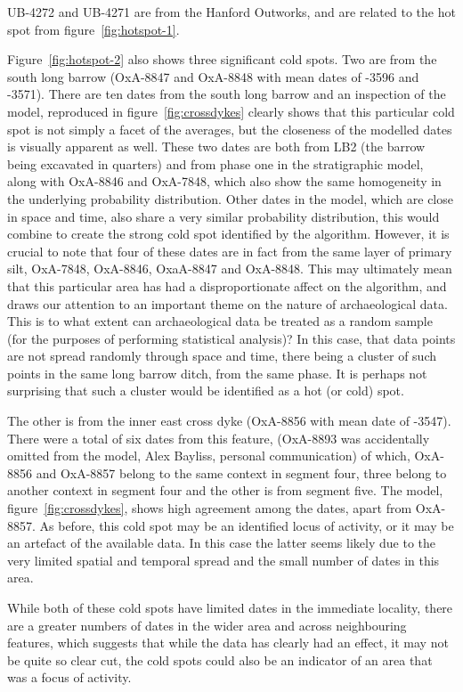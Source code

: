 UB-4272 and UB-4271 are from the Hanford Outworks, and are related to the hot spot from figure~\ref{fig:hotspot-1}.

Figure~\ref{fig:hotspot-2} also shows three significant cold spots. Two are from the south long barrow (OxA-8847 and OxA-8848 with mean dates of -3596 and -3571). There are ten dates from the south long barrow and an inspection of the model, reproduced in figure~\ref{fig:crossdykes} clearly shows that this particular cold spot is not simply a facet of the averages, but the closeness of the modelled dates is visually apparent as well. These two dates are both from LB2 (the barrow being excavated in quarters) and from phase one in the stratigraphic model, along with OxA-8846 and OxA-7848, which also show the same homogeneity in the underlying probability distribution. Other dates in the model, which are close in space and time, also share a very similar probability distribution, this would combine to create the strong cold spot identified by the algorithm. However, it is crucial to note that four of these dates are in fact from the same layer of primary silt, OxA-7848, OxA-8846, OxaA-8847 and OxA-8848. This may ultimately mean that this particular area has had a disproportionate affect on the algorithm, and draws our attention to an important theme on the nature of archaeological data. This is to what extent can archaeological data be treated as a random sample (for the purposes of performing statistical analysis)? In this case, that data points are not spread randomly through space and time, there being a cluster of such points in the same long barrow ditch, from the same phase. It is perhaps not surprising that such a cluster would be identified as a hot (or cold) spot.

The other is from the inner east cross dyke (OxA-8856 with mean date of -3547). There were a total of six dates from this feature, (OxA-8893 was accidentally omitted from the model, Alex Bayliss, personal communication) of which, OxA-8856 and OxA-8857 belong to the same context in segment four, three belong to another context in segment four and the other is from segment five. The model, figure~\ref{fig:crossdykes}, shows high agreement among the dates, apart from OxA-8857. As before, this cold spot may be an identified locus of activity, or it may be an artefact of the available data. In this case the latter seems likely due to the very limited spatial and temporal spread and the small number of dates in this area.

While both of these cold spots have limited dates in the immediate locality, there are a greater numbers of dates in the wider area and across neighbouring features, which suggests that while the data has clearly had an effect, it may not be quite so clear cut, the cold spots could also be an indicator of an area that was a focus of activity. 

